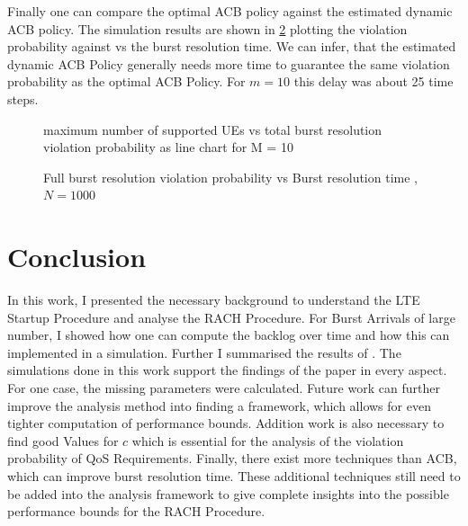 \documentclass[conference]{IEEEtran}
\begin{document}
Finally one can compare the optimal ACB policy against the estimated dynamic ACB policy. The simulation results are shown in \ref{fig:5} plotting the violation probability against vs the burst resolution time. We can infer, that the estimated dynamic ACB Policy generally needs more time to guarantee the same violation probability as the optimal ACB Policy. For $m = 10$ this delay was about 25 time steps.
\begin{figure}
\resizebox{\columnwidth}{!}{}
    \caption{maximum number of supported UEs vs total burst resolution violation probability as line chart for M = {10}}\label{fig:max UEs supported}
\end{figure}
\begin{figure}
\resizebox{\columnwidth}{!}{}
    \caption{Full burst resolution violation probability vs Burst resolution time , $N= 1000$}\label{fig:5}
\end{figure}

\section{Conclusion}
In this work, I presented the necessary background to understand the LTE Startup Procedure and analyse the RACH Procedure.
For Burst Arrivals of large number, I showed how one can compute the backlog over time and how this can implemented in a simulation.
Further I summarised the results of \cite{8422323}.
The simulations done in this work support the findings of the paper in every aspect.
For one case, the missing parameters were calculated.
Future work can further improve the analysis method into finding a framework, which allows for even tighter computation of performance bounds.
Addition work is also necessary to find good Values for $c$ which is essential for the analysis of the violation probability of QoS Requirements.
Finally, there exist more techniques than ACB, which can improve burst resolution time.
These additional techniques still need to be added into the analysis framework to give complete insights into the possible performance bounds for the RACH Procedure.


\end{document}
